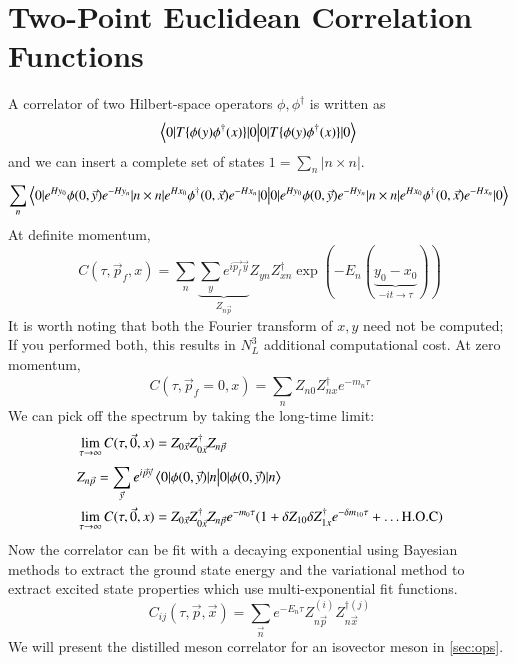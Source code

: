 \section{Two-Point Euclidean Correlation Functions}
A correlator of two Hilbert-space operators $\phi,\phi^\dagger$ is written as 
\begin{equation}
    \braket{0|T\{\phi(y)\phi^{\dagger}(x)\}|0} \\
\end{equation}and we can insert a complete set of states $1 = \sum_{n}^{} |n\times n|$.
\begin{equation}
    \sum_{n}^{} \braket{0|e^{Hy_0}\phi(0,\vec{y})e^{-Hy_n} | n \times n | e^{Hx_0}\phi^{\dagger}(0,\vec{x})e^{-Hx_n}|0} \\
\end{equation} At definite momentum,
\begin{equation}
    C(\tau,\vec{p}_f,x) = \sum_{n}^{} \underbrace{\sum_{y}^{} e^{i\vec{p_f}\vec{y}}}_{Z_{n\vec{p}}} Z_{yn}Z_{xn}^\dagger \exp\left(-E_n(\underbrace{y_0-x_0}_{-it \to \tau})\right)    
\end{equation}
It is worth noting that both the Fourier transform of $x,y$ need not be computed; If you performed both, this results in $N_L^3$ additional computational cost. 
At zero momentum, 
\begin{equation}
    C(\tau,\vec{p}_f=0,x) = \sum_{n}^{} Z_{n0}Z_{nx}^\dagger e^{-m_n\tau} 
\end{equation} 
We can pick off the spectrum by taking the long-time limit: 
\begin{align}
    & \lim_{\tau \to \infty}C(\tau,\vec{0},x) = Z_{0\vec{x}}Z_{0\vec{x}}^\dagger Z_{n\vec{p}}  \\
    & Z_{n\vec{p}} = \sum_{\vec{y}}^{} e^{i\vec{p}\vec{y}}\braket{0|\phi(0,\vec{y})|n} \\ 
    & \lim_{\tau \to \infty}C(\tau,\vec{0},x) = Z_{0\vec{x}}Z_{0\vec{x}}^\dagger Z_{n\vec{p}}e^{-m_0\tau}(1+ \delta Z_{10}\delta Z_{1x}^\dagger e^{-\delta m_{10}\tau} + \dots \text{H.O.C})  \\
\end{align}
Now the correlator can be fit with a decaying exponential using Bayesian methods to extract the ground state energy and the variational method to extract excited state properties which use multi-exponential fit functions. 
\begin{equation}
    C_{ij}(\tau,\vec{p},\vec{x}) = \sum_{\vec{n}}^{} e^{-E_n\tau} Z_{n\vec{p}}^{(i)} Z_{n\vec{x}}^{\dagger(j)}
\end{equation}
We will present the distilled meson correlator for an isovector meson in \cref{sec:ops}.

